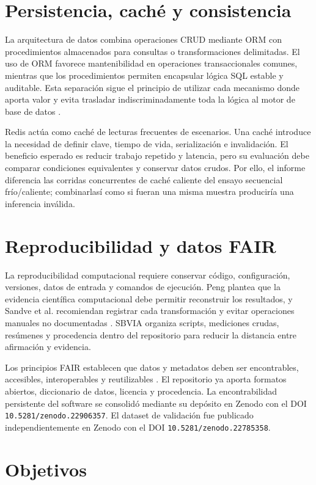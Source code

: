\documentclass[11pt,a4paper]{report}
\begin{document}
\section{Persistencia, caché y consistencia}
La arquitectura de datos combina operaciones CRUD mediante ORM con procedimientos almacenados para consultas o transformaciones delimitadas. El uso de ORM favorece mantenibilidad en operaciones transaccionales comunes, mientras que los procedimientos permiten encapsular lógica SQL estable y auditable. Esta separación sigue el principio de utilizar cada mecanismo donde aporta valor y evita trasladar indiscriminadamente toda la lógica al motor de base de datos \cite{fowler2002patterns, kleppmann2017designing}.

Redis actúa como caché de lecturas frecuentes de escenarios. Una caché introduce la necesidad de definir clave, tiempo de vida, serialización e invalidación. El beneficio esperado es reducir trabajo repetido y latencia, pero su evaluación debe comparar condiciones equivalentes y conservar datos crudos. Por ello, el informe diferencia las corridas concurrentes de caché caliente del ensayo secuencial frío/caliente; combinarlasí como si fueran una misma muestra produciría una inferencia inválida.

\section{Reproducibilidad y datos FAIR}
La reproducibilidad computacional requiere conservar código, configuración, versiones, datos de entrada y comandos de ejecución. Peng plantea que la evidencia científica computacional debe permitir reconstruir los resultados, y Sandve et al. recomiendan registrar cada transformación y evitar operaciones manuales no documentadas \cite{peng2011reproducible, sandve2013ten}. SBVIA organiza scripts, mediciones crudas, resúmenes y procedencia dentro del repositorio para reducir la distancia entre afirmación y evidencia.

Los principios FAIR establecen que datos y metadatos deben ser encontrables, accesibles, interoperables y reutilizables \cite{wilkinson2016fair}. El repositorio ya aporta formatos abiertos, diccionario de datos, licencia y procedencia. La encontrabilidad persistente del software se consolidó mediante su depósito en Zenodo con el DOI \texttt{10.5281/zenodo.22906357}. El dataset de validación fue publicado independientemente en Zenodo con el DOI \texttt{10.5281/zenodo.22785358}.

\section{Objetivos}
\end{document}
